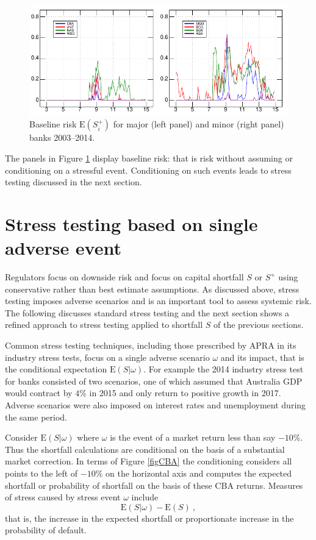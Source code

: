 \documentclass[authoryear]{elsarticle}
\newcommand{\E}{{\mathrm E}}
\newcommand{\fref}[1]{Figure \ref{#1}}
\begin{document}
\begin{figure}[htbp]
\begin{center}
\includegraphics[width=12cm]{figures/defaulttop.pdf}
\caption{Baseline risk $\E(S_i^+)$  for   major (left panel) and  minor (right panel)  banks 2003--2014.}\label{defaulttop}
\end{center}
\end{figure}

The  panels in  \fref{defaulttop} display baseline risk: that is risk without assuming or conditioning on a stressful event.   Conditioning on such events leads to stress testing discussed in the next section.


\section{Stress testing based on single adverse event}\label{s_st}

Regulators focus on downside risk and focus on  capital shortfall $S$ or $S^+$ using conservative rather than best estimate assumptions. As discussed above, stress testing imposes adverse scenarios and is an important tool to assess systemic risk. The following  discusses standard stress testing and the next section shows a refined approach to stress testing applied to  shortfall $S$ of the  previous sections.

Common stress testing techniques, including those prescribed by APRA in its industry stress tests, focus on a single adverse scenario $\omega$ and its impact, that is the conditional expectation $\E(S|\omega)$. For example the 2014 industry stress test for banks consisted of two scenarios, one of which assumed that Australia GDP would contract by $4\%$ in 2015 and only return to positive growth in 2017. Adverse scenarios were also imposed on interest rates and unemployment during the same period.

Consider
$
\E(S| \omega)$
where $\omega$ is the event of  a market return less than say $-10\%$.   Thus the shortfall calculations are conditional on the basis of a substantial market correction.   In terms of \fref{figCBA} the conditioning considers all points to the left of $-10\%$ on the horizontal axis and computes the expected shortfall  or probability of shortfall  on the basis of these CBA returns.
Measures of stress caused by stress event $\omega$   include
$$
\E(S|\omega)-\E(S)\ ,
$$
that is, the  increase in the expected shortfall or proportionate increase in the probability of default.
\end{document}
